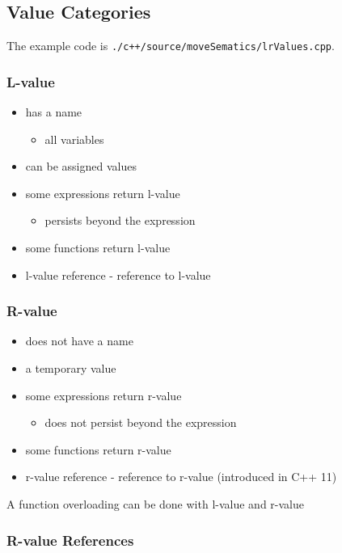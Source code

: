 \subsection{Value Categories} 

The example code is \texttt{./c++/source/moveSematics/lrValues.cpp}.

\subsubsection{L-value} 

\begin{itemize}
    \item has a name
    \begin{itemize}
      \item all variables
    \end{itemize}
    \item can be assigned values
    \item some expressions return l-value
    \begin{itemize}
      \item persists beyond the expression
    \end{itemize}
    \item some functions return l-value
    \item l-value reference - reference to l-value
\end{itemize}

\subsubsection{R-value} 

\begin{itemize}
    \item does not have a name
    \item a temporary value
    \item some expressions return r-value
    \begin{itemize}
      \item does not persist beyond the expression
    \end{itemize}
    \item some functions return r-value
    \item r-value reference - reference to r-value (introduced in C++ 11)
\end{itemize}

A function overloading can be done with l-value and r-value

\subsubsection{R-value References} 


